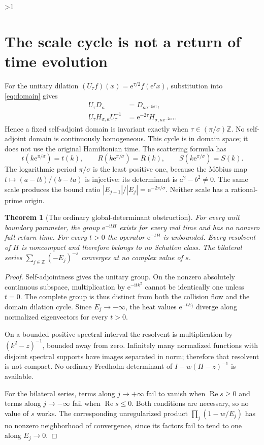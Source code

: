 \documentclass[10pt]{article}
\newcommand{\ii}{\mathrm i}
\newcommand{\e}{\mathrm e}
\newcommand{\Z}{\mathbb Z}
\DeclareMathOperator{\Ree}{Re}
\newtheorem{theorem}{Theorem}
\begin{document}
\ifnum\CRevisionRound>1
\section{The scale cycle is not a return of time evolution}
For the unitary dilation $(U_\tau f)(x)=\e^{\tau/2}f(\e^\tau x)$,
substitution into \eqref{eq:domain} gives
\begin{align}
 U_\tau D_\kappa&=D_{\kappa\e^{-2\ii\sigma\tau}},\nonumber\\
 U_\tau H_{\sigma,\kappa}U_\tau^{-1}
 &=\e^{-2\tau}H_{\sigma,\kappa\e^{-2\ii\sigma\tau}}.
 \label{eq:scale}
\end{align}
Hence a fixed self-adjoint domain is invariant exactly when
$\tau\in(\pi/\sigma)\Z$. No self-adjoint domain is continuously homogeneous.
This cycle is in domain space; it does not use the original Hamiltonian time.
The scattering formula has
\[
 t(k\e^{\pi/\sigma})=t(k),\qquad
 R(k\e^{\pi/\sigma})=R(k),\qquad S(k\e^{\pi/\sigma})=S(k).
\]
The logarithmic period $\pi/\sigma$ is the least positive one, because the
Möbius map $t\mapsto(a-tb)/(b-ta)$ is injective:
its determinant is $a^2-b^2\ne0$. The same scale produces the bound ratio
$|E_{j+1}|/|E_j|=\e^{-2\pi/\sigma}$. Neither scale has a rational-prime origin.

\begin{theorem}[The ordinary global-determinant obstruction]
For every unit boundary parameter, the group $\e^{-\ii tH}$ exists for every
real time and has no nonzero full return time. For every $t>0$ the operator
$\e^{-tH}$ is unbounded. Every resolvent of $H$ is noncompact and therefore
belongs to no Schatten class. The bilateral series
$\sum_{j\in\Z}(-E_j)^{-s}$ converges at no complex value of $s$.
\end{theorem}
\begin{proof}
Self-adjointness gives the unitary group. On the nonzero absolutely continuous
subspace, multiplication by $\e^{-\ii tk^2}$ cannot be identically one unless
$t=0$. The complete group is thus distinct from both the collision flow and
the domain dilation cycle. Since $E_j\to-\infty$, the heat values
$\e^{-tE_j}$ diverge along normalized eigenvectors for every $t>0$.

On a bounded positive spectral interval the resolvent is multiplication
by $(k^2-z)^{-1}$, bounded away from zero. Infinitely many normalized
functions with disjoint spectral supports have images separated in norm;
therefore that resolvent is not compact. No ordinary Fredholm determinant
of $I-w(H-z)^{-1}$ is available.

For the bilateral series, terms along $j\to+\infty$ fail to vanish when
$\Ree s\ge0$ and terms along $j\to-\infty$ fail when $\Ree s\le0$.
Both conditions are necessary, so no value of $s$ works. The corresponding
unregularized product $\prod_j(1-w/E_j)$ has no nonzero neighborhood of
convergence, since its factors fail to tend to one along $E_j\to0$.
\end{proof}
\end{document}
